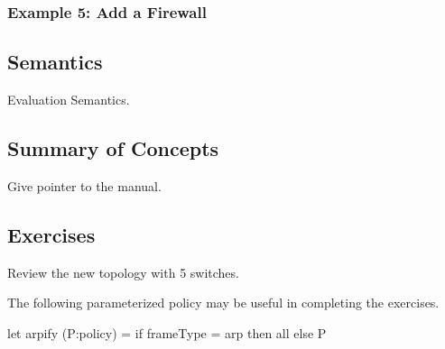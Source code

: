 \documentclass{article}
\begin{document}
\subsubsection{Example 5:  Add a Firewall}

\subsection{Semantics}

Evaluation Semantics.

\subsection{Summary of Concepts}

Give pointer to the manual.

\subsection{Exercises}

Review the new topology with 5 switches.  

The following parameterized policy may be useful in completing the
exercises.

\begin{progeg}
let arpify (P:policy) =
  if frameType = arp then all
  else P
\end{progeg}
\end{document}
